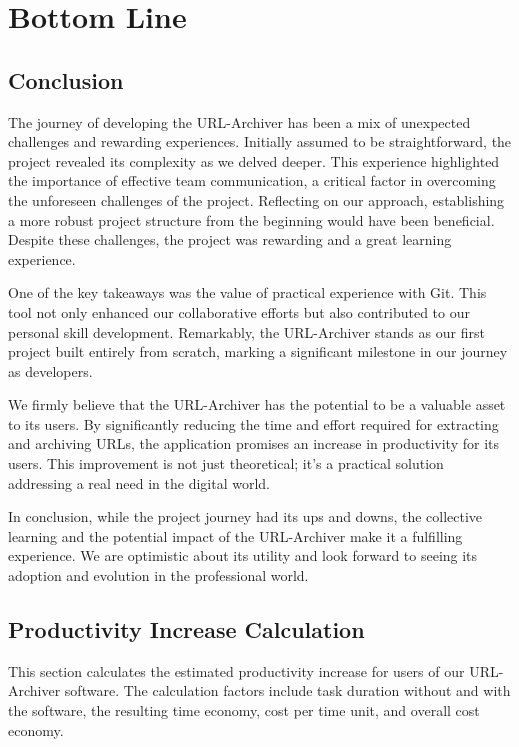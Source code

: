 \section{Bottom Line}

\subsection{Conclusion}
The journey of developing the URL-Archiver has been a mix of unexpected challenges and rewarding experiences.
Initially assumed to be straightforward, the project revealed its complexity as we delved deeper.
This experience highlighted the importance of effective team communication, a critical factor in overcoming the unforeseen challenges of the project.
Reflecting on our approach, establishing a more robust project structure from the beginning would have been beneficial.
Despite these challenges, the project was rewarding and a great learning experience.

One of the key takeaways was the value of practical experience with Git.
This tool not only enhanced our collaborative efforts but also contributed to our personal skill development.
Remarkably, the URL-Archiver stands as our first project built entirely from scratch, marking a significant milestone in our journey as developers.

We firmly believe that the URL-Archiver has the potential to be a valuable asset to its users.
By significantly reducing the time and effort required for extracting and archiving URLs, the application promises an increase in productivity for its users.
This improvement is not just theoretical; it's a practical solution addressing a real need in the digital world.

In conclusion, while the project journey had its ups and downs, the collective learning and the potential impact of the URL-Archiver make it a fulfilling experience.
We are optimistic about its utility and look forward to seeing its adoption and evolution in the professional world.

\subsection{Productivity Increase Calculation}
This section calculates the estimated productivity increase for users of our URL-Archiver software.
The calculation factors include task duration without and with the software, the resulting time economy, cost per time unit, and overall cost economy.

